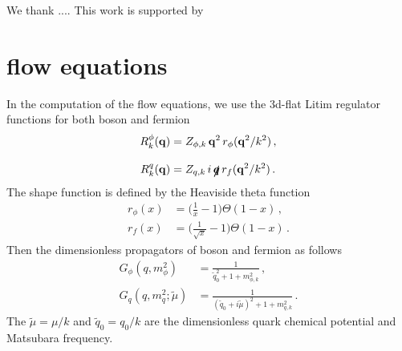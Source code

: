 \documentclass[aps,twocolumn,prd,superscriptaddress,nofootinbib,floatfix]{revtex4-2}
\begin{document}
We thank .... This work is supported by 

\appendix 
\section{flow equations}
\label{app:flow_eq}

In the computation of the flow equations, we use the 3d-flat Litim regulator functions \cite{Litim:2000ci} for both boson and fermion
%
\begin{align}
R^\phi_k(\mathbf{q})&=Z_{\phi,k}\,\mathbf{q}^2\,r_\phi(\mathbf{q}^2/k^2)\,,\\[2ex]
R^q_k(\mathbf{q})&=Z_{q,k}\,i\,\bm{\slashed{q}}\,r_f(\mathbf{q}^2/k^2)\,.
\end{align}
%
The shape function is defined by the Heaviside theta function
%
\begin{align}
r_\phi(x)&=\bigg(\frac{1}{x}-1\bigg)\Theta(1-x)\,,\\[2ex]
r_f(x)&=\bigg(\frac{1}{\sqrt x}-1\bigg)\Theta(1-x)\,.
\end{align}
%
Then the dimensionless propagators of boson and fermion as follows
%
\begin{align}
G_\phi(q,m^2_\phi)&=\frac{1}{\tilde q_0^2+1+m^2_{\phi,k}}\,,\\[2ex]
G_q(q,m^2_q;\tilde \mu)&=\frac{1}{(\tilde q_0+i\tilde\mu)^2+1+m^2_{q,k}}\,.
\end{align}
%
The $\tilde\mu=\mu/k$ and $\tilde q_0=q_0/k$ are the dimensionless quark chemical potential and Matsubara frequency.
\end{document}
